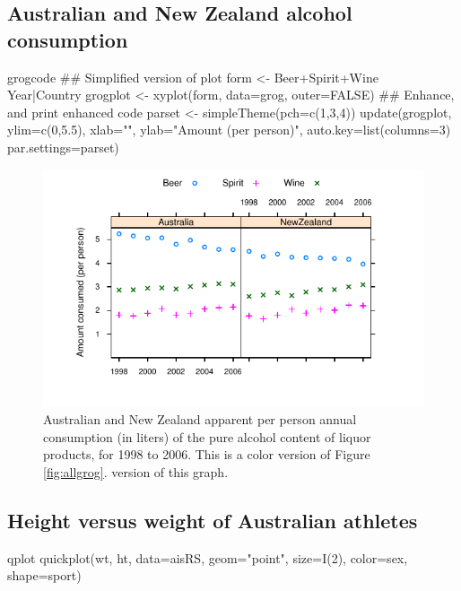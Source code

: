 



\subsection*{Australian and New Zealand alcohol consumption}

\begin{SaveVerbatim}{grogcode}
## Simplified version of plot
form <-
  Beer+Spirit+Wine ~ Year|Country
grogplot <- xyplot(form, data=grog,
                   outer=FALSE)
## Enhance, and print enhanced code
parset <- simpleTheme(pch=c(1,3,4))
update(grogplot, ylim=c(0,5.5),
       xlab="",
       ylab="Amount (per person)",
       auto.key=list(columns=3)
       par.settings=parset)
\end{SaveVerbatim}

\begin{figure}
\includegraphics[trim=9 18 0 15]{colorArt/allgrog}%
  \caption{Australian and New Zealand apparent per person annual
  consumption (in liters) of the pure alcohol content of liquor products, for
  1998 to 2006.  This is a color version of Figure \ref{fig:allgrog}.
version of this graph.
\protect{}
\label{col:fig31}}
\vspace*{18pt}
\end{figure}

\subsection*{Height versus weight of Australian athletes}
\begin{SaveVerbatim}{qplot}
quickplot(wt, ht, data=aisRS,
     geom="point", size=I(2),
     color=sex, shape=sport)
\end{SaveVerbatim}

